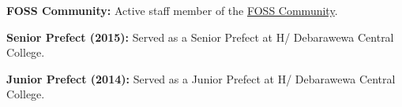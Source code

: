 
\begin{onecolentry}
   \textbf{FOSS Community:} Active staff member of the \href{https://t.me/FossDroidAndroid}{FOSS Community}.
   \vspace*{0.1 cm}

   \textbf{Senior Prefect (2015):} Served as a Senior Prefect at H/ Debarawewa Central College.
   \vspace*{0.1 cm}

   \textbf{Junior Prefect (2014):} Served as a Junior Prefect at H/ Debarawewa Central College.
\end{onecolentry}